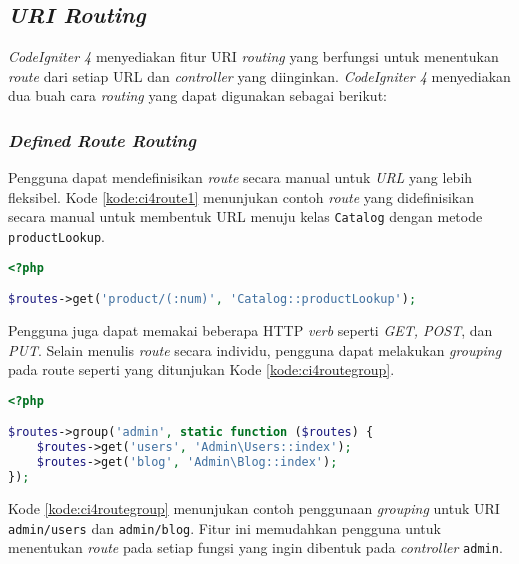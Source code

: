 \subsection{\textit{URI Routing}}
\textit{CodeIgniter 4} menyediakan fitur URI \textit{routing} yang berfungsi untuk menentukan \textit{route} dari setiap URL dan \textit{controller} yang diinginkan. \textit{CodeIgniter 4} menyediakan dua buah cara \textit{routing} yang dapat digunakan sebagai berikut:
\subsubsection{\textit{Defined Route Routing}}
Pengguna dapat mendefinisikan \textit{route} secara manual untuk \textit{URL} yang lebih fleksibel. Kode \ref{kode:ci4route1} menunjukan contoh \textit{route} yang didefinisikan secara manual untuk membentuk URL menuju kelas \texttt{Catalog} dengan metode \texttt{productLookup}.
\begin{lstlisting}[language=PHP,caption=Contoh \textit{route} yang didefinisikan secara manual,label=kode:ci4route1]
<?php

$routes->get('product/(:num)', 'Catalog::productLookup');
\end{lstlisting}
Pengguna juga dapat memakai beberapa HTTP \textit{verb} seperti \textit{GET, POST}, dan \textit{PUT}. Selain menulis \textit{route} secara individu, pengguna dapat melakukan \textit{grouping} pada route seperti yang ditunjukan Kode \ref{kode:ci4routegroup}.
\begin{lstlisting}[language=PHP,caption=Contoh \textit{route} yang menggunakan \textit{grouping} manual,label=kode:ci4routegroup]
<?php

$routes->group('admin', static function ($routes) {
    $routes->get('users', 'Admin\Users::index');
    $routes->get('blog', 'Admin\Blog::index');
});
\end{lstlisting}

Kode \ref{kode:ci4routegroup} menunjukan contoh penggunaan \textit{grouping} untuk URI \texttt{admin/users} dan \texttt{admin/blog}. Fitur ini memudahkan pengguna untuk menentukan \textit{route} pada setiap fungsi yang ingin dibentuk pada \textit{controller} \texttt{admin}.


